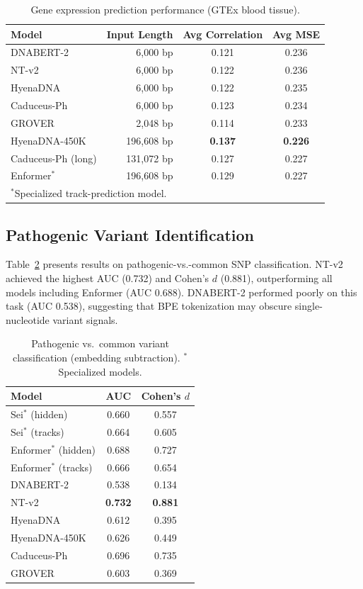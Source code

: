 \documentclass[11pt]{article}
\begin{document}
\begin{table}[ht]
\centering
\caption{Gene expression prediction performance (GTEx blood tissue).}
\label{tab:geneexpr}
\begin{tabular}{@{}lrcc@{}}
\toprule
Model & Input Length & Avg Correlation & Avg MSE \\
\midrule
DNABERT-2 & 6,000 bp & 0.121 & 0.236 \\
NT-v2 & 6,000 bp & 0.122 & 0.236 \\
HyenaDNA & 6,000 bp & 0.122 & 0.235 \\
Caduceus-Ph & 6,000 bp & 0.123 & 0.234 \\
GROVER & 2,048 bp & 0.114 & 0.233 \\
HyenaDNA-450K & 196,608 bp & \textbf{0.137} & \textbf{0.226} \\
Caduceus-Ph (long) & 131,072 bp & 0.127 & 0.227 \\
Enformer$^*$ & 196,608 bp & 0.129 & 0.227 \\
\bottomrule
\multicolumn{4}{l}{\footnotesize $^*$Specialized track-prediction model.}
\end{tabular}
\end{table}

\subsection{Pathogenic Variant Identification}

Table~\ref{tab:pathogenic} presents results on pathogenic-vs.-common SNP classification.  NT-v2 achieved the highest AUC (0.732) and Cohen's $d$ (0.881), outperforming all models including Enformer (AUC 0.688).  DNABERT-2 performed poorly on this task (AUC 0.538), suggesting that BPE tokenization may obscure single-nucleotide variant signals.

\begin{table}[ht]
\centering
\caption{Pathogenic vs.\ common variant classification (embedding subtraction). $^*$Specialized models.}
\label{tab:pathogenic}
\begin{tabular}{@{}lcc@{}}
\toprule
Model & AUC & Cohen's $d$ \\
\midrule
Sei$^*$ (hidden) & 0.660 & 0.557 \\
Sei$^*$ (tracks) & 0.664 & 0.605 \\
Enformer$^*$ (hidden) & 0.688 & 0.727 \\
Enformer$^*$ (tracks) & 0.666 & 0.654 \\
DNABERT-2 & 0.538 & 0.134 \\
NT-v2 & \textbf{0.732} & \textbf{0.881} \\
HyenaDNA & 0.612 & 0.395 \\
HyenaDNA-450K & 0.626 & 0.449 \\
Caduceus-Ph & 0.696 & 0.735 \\
GROVER & 0.603 & 0.369 \\
\bottomrule
\end{tabular}
\end{table}
\end{document}
